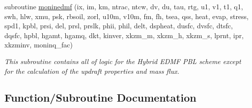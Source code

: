 \begin{DoxyCompactItemize}
\item 
subroutine \hyperlink{group___h_e_d_m_e_f_ga367b6dabfff601023af323f900db86d2}{moninedmf} (ix, im, km, ntrac, ntcw, dv, du, tau, rtg, u1, v1, t1, q1, swh, hlw, xmu, psk, rbsoil, zorl, u10m, v10m, fm, fh, tsea, qss, heat, evap, stress, spd1, kpbl, prsi, del, prsl, prslk, phii, phil, delt, dspheat, dusfc, dvsfc, dtsfc, dqsfc, hpbl, hgamt, hgamq, dkt, kinver, xkzm\+\_\+m, xkzm\+\_\+h, xkzm\+\_\+s, lprnt, ipr, xkzminv, moninq\+\_\+fac)
\begin{DoxyCompactList}\small\item\em This subroutine contains all of logic for the Hybrid E\+D\+MF P\+BL scheme except for the calculation of the updraft properties and mass flux. \end{DoxyCompactList}\end{DoxyCompactItemize}


\subsection{Function/\+Subroutine Documentation}
\mbox{\label{group___h_e_d_m_e_f_ga367b6dabfff601023af323f900db86d2}} 
